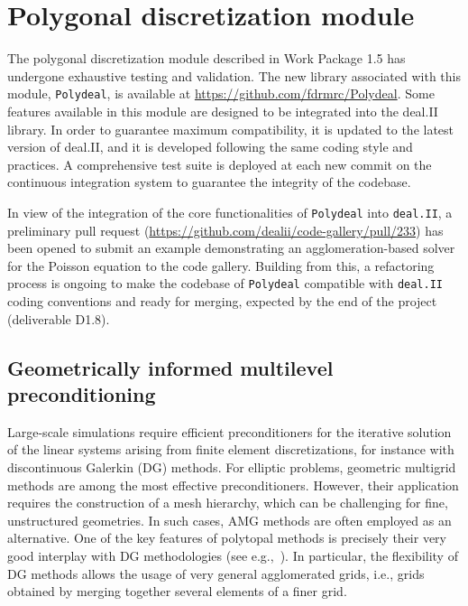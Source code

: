 \documentclass[a4paper,12pt]{article}
\begin{document}
\section{{Polygonal discretization module}}
\label{sec:section4}

The polygonal discretization module described in Work Package 1.5 has undergone exhaustive testing and validation. The new library
associated with this module, \texttt{Polydeal}, is available at \url{https://github.com/fdrmrc/Polydeal}. Some features available in this
module are designed to be integrated into the deal.II library. In order to guarantee maximum compatibility, it is updated to the latest version of deal.II, and it is developed following the same coding style and practices.
A comprehensive test suite is deployed at each new commit on the continuous integration system to guarantee the integrity of the codebase.

In view of the integration of the core functionalities of \texttt{Polydeal} into \texttt{deal.II}, a preliminary pull request (\url{https://github.com/dealii/code-gallery/pull/233}) has been opened to submit an example demonstrating an agglomeration-based solver for the Poisson equation to the code gallery. Building from this, a refactoring process is ongoing to make the codebase of \texttt{Polydeal} compatible with \texttt{deal.II} coding conventions and ready for merging, expected by the end of the project (deliverable D1.8).

\subsection{Geometrically informed multilevel preconditioning}
Large-scale simulations require efficient preconditioners for the iterative solution of the linear systems arising from finite element discretizations, for instance with discontinuous Galerkin (DG) methods. For elliptic problems, geometric multigrid methods are among the most effective preconditioners. However, their application requires the construction of a mesh hierarchy, which can be challenging for fine, unstructured geometries. In such cases, AMG methods are often employed as an alternative. One of the key features of polytopal methods is precisely their very good interplay with DG methodologies (see e.g.,~\cite{polyDG,Antoniettihp}). In particular, the
flexibility of DG methods allows the usage of very general agglomerated grids, i.e., grids obtained by merging together several elements of a
finer grid.
\end{document}
